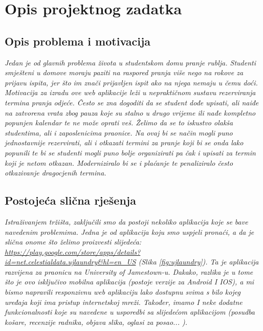 \chapter{Opis projektnog zadatka}
		
		\section{Opis problema i motivacija}
		
			\textit{Jedan je od glavnih problema života u studentskom domu pranje rublja. Studenti smješteni u domove
			moraju paziti na raspored pranja više nego na rokove za prijavu ispita, jer što im znači prijavljen ispit ako
			na njega nemaju u čemu doći. Motivacija za izradu ove web aplikacije leži u nepraktičnom sustavu
			rezerviranja termina pranja odjeće. Često se zna dogoditi da se student dođe upisati, ali naiđe na
			zatvorena vrata zbog pauza koje su stalno u drugo vrijeme ili nađe kompletno popunjen kalendar te ne
			može oprati veš. Želimo da se to iskustvo olakša studentima, ali i zaposlenicima praonice. Na ovaj bi se
			način mogli puno jednostavnije rezervirati, ali i otkazati termini za pranje koji bi se onda lako popunili te
			bi se studenti mogli puno bolje organizirati pa čak i upisati za termin koji je netom otkazan.
			Moderniziralo bi se i plaćanje te penaliziralo često otkazivanje dragocjenih termina.}
		
		\section{Postojeća slična rješenja}
		
			\textit{Istraživanjem tržišta, zaključili smo da postoji nekoliko aplikacija koje se bave navedenim problemima.
			Jedna je od aplikacija koju smo uspjeli pronaći, a da je slična onome što želimo proizvesti slijedeća:
			\url{https://play.google.com/store/apps/details?id=net.celestialdata.ujlaundry&hl=en_US} (Slika  \ref{fig:ujlaundry}). Ta je aplikacija
			razvijena za praonicu na University of Jamestown-u. Dakako, razlika je u tome što je ovo isključivo
			mobilna aplikacija (postoje verzije za Android I IOS), a mi bismo napravili responzivnu web aplikaciju lako
			dostupnu svima s bilo kojeg uređaja koji ima pristup internetskoj mreži. Također, imamo I neke dodatne
			funkcionalnosti koje su navedene u usporedbi sa slijedećom aplikacijom (posudba košare, recenzije
			radnika, objava slika, oglasi za posao... ).}
		
